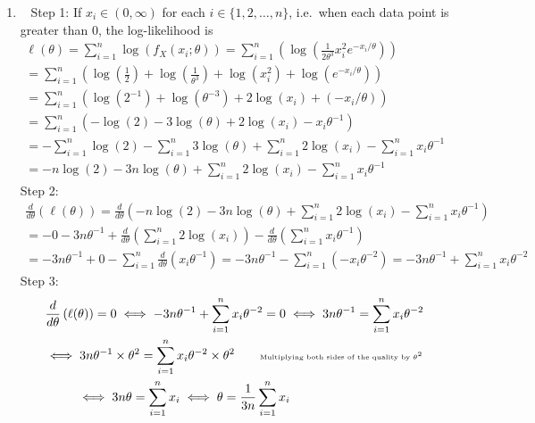 \begin{Answer}
\begin{enumerate}
\item~
{\sf Step 1:} If $x_i \in (0,\infty)$ for each $i \in \{1,2,\ldots,n\}$, i.e.~when each data point is greater than $0$, the log-likelihood is
\begin{multline*}
\ell(\theta) = \sum_{i=1}^n \log\left(f_{X}(x_i;\theta)\right)
= \sum_{i=1}^n \left(\log\left(  \frac{1}{2 \theta^3}x_i^2 e^{-x_i/\theta} \right)\right)\\
= \sum_{i=1}^n \left(\log\left(  \frac{1}{2} \right) + \log\left(\frac{1}{ \theta^3}\right) + \log \left(x_i^2 \right) + \log \left( e^{-x_i/\theta} \right) \right)\\
= \sum_{i=1}^n \left(\log\left(  2^{-1} \right) + \log\left(\theta^{-3}\right) + 2 \log \left(x_i \right) + (-x_i/\theta) \right)\\
= \sum_{i=1}^n \left(-\log\left(  2 \right) -3 \log\left(\theta\right) + 2 \log \left(x_i \right) - x_i \theta^{-1} \right)\\
= -\sum_{i=1}^n \log(  2 ) - \sum_{i=1}^n 3 \log(\theta) + \sum_{i=1}^n 2 \log (x_i) - \sum_{i=1}^n x_i \theta^{-1}\\ 
= -n \log(  2 ) - 3 n  \log(\theta) + \sum_{i=1}^n 2 \log (x_i) - \sum_{i=1}^n x_i \theta^{-1} 
\end{multline*} 
{\sf Step 2:}
\begin{multline*}
\frac{d}{d \theta} \left( \ell(\theta)\right) 
= \frac{d}{d \theta} \left( -n \log(  2 ) - 3 n  \log(\theta) + \sum_{i=1}^n 2 \log (x_i) - \sum_{i=1}^n x_i \theta^{-1} \right)\\ 
= -0 - 3 n \theta^{-1} + \frac{d}{d \theta} \left(\sum_{i=1}^n 2 \log (x_i)\right) - \frac{d}{d \theta} \left( \sum_{i=1}^n x_i \theta^{-1} \right)\\ 
= - 3 n \theta^{-1} + 0 - \sum_{i=1}^n \frac{d}{d \theta} \left( x_i \theta^{-1} \right) 
= - 3 n \theta^{-1} - \sum_{i=1}^n \left( -x_i \theta^{-2} \right) 
= - 3 n \theta^{-1} + \sum_{i=1}^n x_i \theta^{-2} 
\end{multline*}
{\sf Step 3:}
\begin{multline*}
\frac{d}{d \theta} \left( \ell(\theta)\right) = 0 \iff - 3 n \theta^{-1} + \sum_{i=1}^n x_i \theta^{-2}=0
\iff 3 n \theta^{-1} = \sum_{i=1}^n x_i \theta^{-2} \\
\iff 3 n \theta^{-1} \times \theta^2 =  \sum_{i=1}^n x_i \theta^{-2} \times \theta^2 \qquad {\text{\tiny Multiplying both sides of the quality by $\theta^2$}}\\
\iff 3 n \theta = \sum_{i=1}^n x_i \iff \theta = \frac{1}{3n} \sum_{i=1}^n x_i \qquad \qquad \qquad \qquad

\end{multline*}
\end{enumerate}
\end{Answer}
